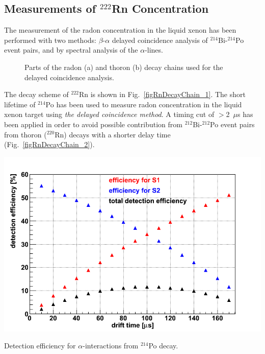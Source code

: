 \subsection{Measurements of $^{222}$Rn Concentration}
\label{secDelayedCoincidenceRn222}

The measurement of the radon concentration in the liquid xenon has been performed with two methods:  $\beta$-$\alpha$ delayed coincidence analysis of $^{214}$Bi-$^{214}$Po event pairs, and by spectral analysis of the $\alpha$-lines.

\begin{figure}[!h]
\centering
{}
\caption[Parts of the radon and thoron decay chains used for the delayed coincidence analysis]{Parts of the radon (a) and thoron (b) decay chains used for the delayed coincidence analysis.}
\label{figRnDecayChain}
\end{figure}

The decay scheme of $^{222}$Rn is shown in Fig.~\ref{figRnDecayChain_1}. The short lifetime of $^{214}$Po has been used to measure radon concentration in the liquid xenon target using {\it the delayed coincidence method}. A timing cut of $>$2~$\mu$s has been applied in order to avoid possible contribution from $^{212}$Bi-$^{212}$Po event pairs from thoron ($^{220}$Rn) decays with a shorter delay time (Fig.~\ref{figRnDecayChain_2}). 

\begin{floatingfigure}[lh]{0.475\textwidth}
\centering
\includegraphics[width=0.475\linewidth]{plots/RnDC/detEff_total.png}
\caption[Detection efficiency for $\alpha$-interactions from $^{214}$Po decay]{Detection efficiency for $\alpha$-interactions from $^{214}$Po decay.}
\label{figBiPoDetEff}
\end{floatingfigure}

